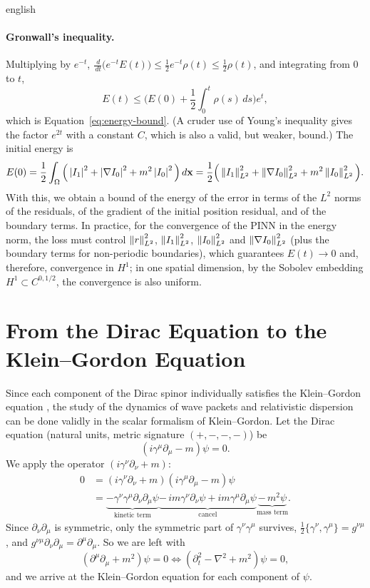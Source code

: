 \documentclass[0000.tex]{subfiles}
\begin{document}
\begin{hyphenrules}{english}
\paragraph{Gronwall's inequality.}
Multiplying by $e^{-t}$, $\frac{\,d}{\,d t}\big(e^{-t}E(t)\big)\le\frac12e^{-t}\rho(t)\le\frac12\rho(t)$, and
integrating from $0$ to $t$,
\[
  E(t)\le\Big(E(0)+\frac12\int_0^t\rho(s)\,d s\Big)e^{t},
\]
which is Equation~\eqref{eq:energy-bound}. (A cruder use of Young's inequality gives the factor $e^{2t}$ with a constant $C$, which is also
a valid, but weaker, bound.) The initial energy is
\[
  E(0)=\frac12\int_\Omega\Big(\left\lvert I_1 \right\rvert^2+\left\lvert \nabla I_0 \right\rvert^2+m^2\left\lvert I_0 \right\rvert^2\Big)\,d\mathbf{x}
  =\frac12\Big(\left\lVert I_1 \right\rVert^2_{L^2}+\left\lVert \nabla I_0 \right\rVert^2_{L^2}+m^2\left\lVert I_0 \right\rVert^2_{L^2}\Big).
\]
With this, we obtain a bound of the energy of the error in terms of the $L^2$ norms of the residuals, of the
gradient of the initial position residual, and of the boundary terms. In practice, for the convergence of
the PINN in the energy norm, the loss must control $\left\lVert r \right\rVert^2_{L^2}$, $\left\lVert I_1 \right\rVert^2_{L^2}$,
$\left\lVert I_0 \right\rVert^2_{L^2}$ and $\left\lVert \nabla I_0 \right\rVert^2_{L^2}$ (plus the boundary terms for non-periodic boundaries),
which guarantees $E(t)\to0$ and, therefore, convergence in $H^1$; in one spatial dimension, by the Sobolev
embedding $H^1\subset C^{0,1/2}$, the convergence is also uniform.

\section{From the Dirac Equation to the Klein--Gordon Equation}\label{app:dirac}

Since each component of the Dirac spinor individually satisfies the Klein--Gordon equation
\cite{bjorken1964}, the study of the dynamics of wave packets and relativistic dispersion can be done
validly in the scalar formalism of Klein--Gordon. Let the Dirac equation (natural units, metric signature
$(+,-,-,-)$) be
\begin{equation}
  (i\gamma^{\mu}\partial_\mu-m)\psi=0.
  \label{eq:dirac}
\end{equation}
We apply the operator $(i\gamma^{\nu}\partial_\nu+m)$:
\begin{align*}
  0&=(i\gamma^{\nu}\partial_\nu+m)(i\gamma^{\mu}\partial_\mu-m)\psi\\
   &=\underbrace{-\gamma^{\nu}\gamma^{\mu}\partial_\nu\partial_\mu\psi}_{\text{kinetic term}}
     \underbrace{-\,i m\gamma^{\nu}\partial_\nu\psi+i m\gamma^{\mu}\partial_\mu\psi}_{\text{cancel}}
     \underbrace{-\,m^2\psi}_{\text{mass term}}.
\end{align*}
Since $\partial_\nu\partial_\mu$ is symmetric, only the symmetric part of $\gamma^{\nu}\gamma^{\mu}$ survives,
$\frac12\{\gamma^{\nu},\gamma^{\mu}\}=g^{\nu\mu}$, and $g^{\nu\mu}\partial_\nu\partial_\mu=\partial^{\mu}\partial_\mu$.
So we are left with
\[
  (\partial^{\mu}\partial_\mu+m^2)\psi=0\iff(\partial_t^2-\nabla^2+m^2)\psi=0,
\]
and we arrive at the Klein--Gordon equation for each component of $\psi$.

\end{hyphenrules}

\ifSubfilesClassLoaded{}{}
\end{document}
